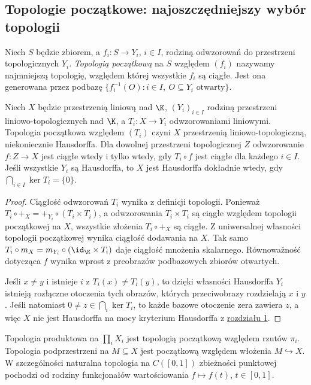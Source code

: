 \subsection{Topologie początkowe: najoszczędniejszy wybór topologii}

\begin{definicja}
Niech $S$ będzie zbiorem, a $f_i:S\to Y_i$, $i\in I$,
rodziną odwzorowań do przestrzeni topologicznych $Y_i$.
\emph{Topologią początkową} na $S$ względem $(f_i)$
nazywamy najmniejszą topologię, względem której wszystkie
$f_i$ są ciągłe. Jest ona generowana przez podbazę
$\{f_i^{-1}(O):i\in I,\ O\subseteq Y_i\text{ otwarty}\}$.
\end{definicja}

\begin{twierdzenie}\label{thm:initial-tvs}
Niech $X$ będzie przestrzenią liniową nad $\K$, $(Y_i)_{i\in I}$
rodziną przestrzeni liniowo-topologicznych nad $\K$,
a $T_i:X\to Y_i$ odwzorowaniami liniowymi.
Topologia początkowa względem $(T_i)$ czyni $X$
przestrzenią liniowo-topologiczną, niekoniecznie Hausdorffa.
Dla dowolnej przestrzeni topologicznej $Z$ odwzorowanie
$f:Z\to X$ jest ciągłe wtedy i tylko wtedy, gdy
$T_i\circ f$ jest ciągłe dla każdego $i\in I$.
Jeśli wszystkie $Y_i$ są Hausdorffa, to $X$ jest Hausdorffa
dokładnie wtedy, gdy $\bigcap_{i\in I}\ker T_i=\{0\}$.
\end{twierdzenie}
\begin{proof}
Ciągłość odwzorowań $T_i$ wynika z definicji topologii.
Ponieważ $T_i\circ+_X=+_{Y_i}\circ(T_i\times T_i)$,
a odwzorowania $T_i\times T_i$ są ciągłe względem
topologii początkowej na $X$, wszystkie złożenia
$T_i\circ+_X$ są ciągłe. Z uniwersalnej własności
topologii początkowej wynika ciągłość dodawania na $X$.
Tak samo $T_i\circ m_X=m_{Y_i}\circ(\id_\K\times T_i)$
daje ciągłość mnożenia skalarnego. Równoważność dotycząca
$f$ wynika wprost z preobrazów podbazowych zbiorów otwartych.

Jeśli $x\ne y$ i istnieje $i$ z $T_i(x)\ne T_i(y)$,
to dzięki własności Hausdorffa $Y_i$ istnieją rozłączne
otoczenia tych obrazów, których przeciwobrazy rozdzielają
$x$ i $y$. Jeśli natomiast $0\ne z\in\bigcap_i\ker T_i$,
to każde bazowe otoczenie zera zawiera $z$, a więc
$X$ nie jest Hausdorffa na mocy kryterium Hausdorffa
z \hyperref[sec:tvs]{rozdziału 1}.
\end{proof}

\begin{przyklad}
Topologia produktowa na $\prod_iX_i$ jest topologią
początkową względem rzutów $\pi_i$.
Topologia podprzestrzeni na $M\subseteq X$ jest
początkową względem włożenia $M\hookrightarrow X$.
W szczególności naturalna topologia na $C([0,1])$
zbieżności punktowej pochodzi od rodziny funkcjonałów
wartościowania $f\mapsto f(t)$, $t\in[0,1]$.
\end{przyklad}

